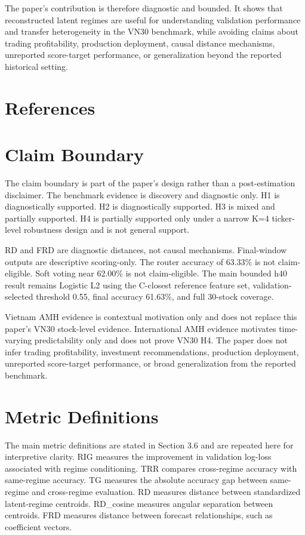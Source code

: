 \documentclass[12pt,a4paper]{article}
\begin{document}
The paper's contribution is therefore diagnostic and bounded. It shows that reconstructed latent regimes are useful for understanding validation performance and transfer heterogeneity in the VN30 benchmark, while avoiding claims about trading profitability, production deployment, causal distance mechanisms, unreported score-target performance, or generalization beyond the reported historical setting.

\clearpage
\section*{References}



\clearpage
\appendix

\section{Claim Boundary}

The claim boundary is part of the paper's design rather than a post-estimation disclaimer. The benchmark evidence is discovery and diagnostic only. H1 is diagnostically supported. H2 is diagnostically supported. H3 is mixed and partially supported. H4 is partially supported only under a narrow K=4 ticker-level robustness design and is not general support.

RD and FRD are diagnostic distances, not causal mechanisms. Final-window outputs are descriptive scoring-only. The router accuracy of 63.33\% is not claim-eligible. Soft voting near 62.00\% is not claim-eligible. The main bounded h40 result remains Logistic L2 using the C-closest reference feature set, validation-selected threshold 0.55, final accuracy 61.63\%, and full 30-stock coverage.

Vietnam AMH evidence is contextual motivation only and does not replace this paper's VN30 stock-level evidence. International AMH evidence motivates time-varying predictability only and does not prove VN30 H4. The paper does not infer trading profitability, investment recommendations, production deployment, unreported score-target performance, or broad generalization from the reported benchmark.

\section{Metric Definitions}

The main metric definitions are stated in Section 3.6 and are repeated here for interpretive clarity. RIG measures the improvement in validation log-loss associated with regime conditioning. TRR compares cross-regime accuracy with same-regime accuracy. TG measures the absolute accuracy gap between same-regime and cross-regime evaluation. RD measures distance between standardized latent-regime centroids. RD\_cosine measures angular separation between centroids. FRD measures distance between forecast relationships, such as coefficient vectors.
\end{document}
